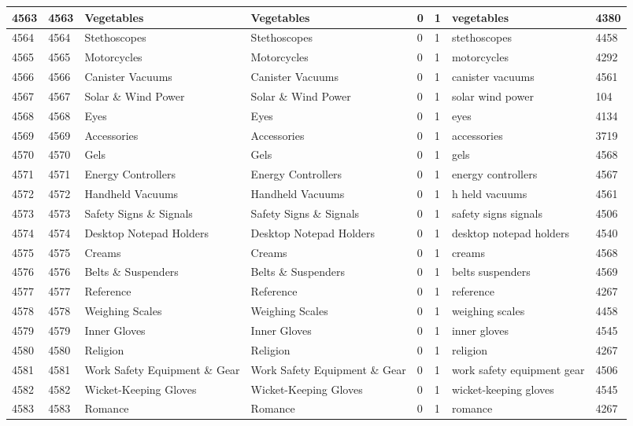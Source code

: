 \begin{longtable}{|l|l|l|l|l|l|l|l|}
4563 & 4563 & Vegetables & Vegetables & 0 & 1 & vegetables & 4380 \\ \hline 
4564 & 4564 & Stethoscopes & Stethoscopes & 0 & 1 & stethoscopes & 4458 \\ \hline 
4565 & 4565 & Motorcycles & Motorcycles & 0 & 1 & motorcycles & 4292 \\ \hline 
4566 & 4566 & Canister Vacuums & Canister Vacuums & 0 & 1 & canister vacuums & 4561 \\ \hline 
4567 & 4567 & Solar \& Wind Power & Solar \& Wind Power & 0 & 1 & solar wind power & 104 \\ \hline 
4568 & 4568 & Eyes & Eyes & 0 & 1 & eyes & 4134 \\ \hline 
4569 & 4569 & Accessories & Accessories & 0 & 1 & accessories & 3719 \\ \hline 
4570 & 4570 & Gels & Gels & 0 & 1 & gels & 4568 \\ \hline 
4571 & 4571 & Energy Controllers & Energy Controllers & 0 & 1 & energy controllers & 4567 \\ \hline 
4572 & 4572 & Handheld Vacuums & Handheld Vacuums & 0 & 1 & h held vacuums & 4561 \\ \hline 
4573 & 4573 & Safety Signs \& Signals & Safety Signs \& Signals & 0 & 1 & safety signs signals & 4506 \\ \hline 
4574 & 4574 & Desktop Notepad Holders & Desktop Notepad Holders & 0 & 1 & desktop notepad holders & 4540 \\ \hline 
4575 & 4575 & Creams & Creams & 0 & 1 & creams & 4568 \\ \hline 
4576 & 4576 & Belts \& Suspenders & Belts \& Suspenders & 0 & 1 & belts suspenders & 4569 \\ \hline 
4577 & 4577 & Reference & Reference & 0 & 1 & reference & 4267 \\ \hline 
4578 & 4578 & Weighing Scales & Weighing Scales & 0 & 1 & weighing scales & 4458 \\ \hline 
4579 & 4579 & Inner Gloves & Inner Gloves & 0 & 1 & inner gloves & 4545 \\ \hline 
4580 & 4580 & Religion & Religion & 0 & 1 & religion & 4267 \\ \hline 
4581 & 4581 & Work Safety Equipment \& Gear & Work Safety Equipment \& Gear & 0 & 1 & work safety equipment gear & 4506 \\ \hline 
4582 & 4582 & Wicket-Keeping Gloves & Wicket-Keeping Gloves & 0 & 1 & wicket-keeping gloves & 4545 \\ \hline 
4583 & 4583 & Romance & Romance & 0 & 1 & romance & 4267 \\ \hline 

\end{longtable}
